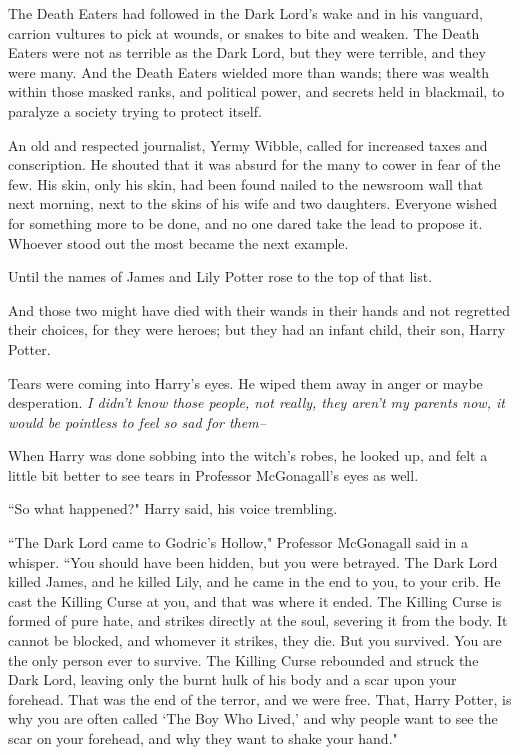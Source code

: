 The Death Eaters had followed in the Dark Lord's wake and in his vanguard, carrion vultures to pick at wounds, or snakes to bite and weaken. The Death Eaters were not as terrible as the Dark Lord, but they were terrible, and they were many. And the Death Eaters wielded more than wands; there was wealth within those masked ranks, and political power, and secrets held in blackmail, to paralyze a society trying to protect itself.

An old and respected journalist, Yermy Wibble, called for increased taxes and conscription. He shouted that it was absurd for the many to cower in fear of the few. His skin, only his skin, had been found nailed to the newsroom wall that next morning, next to the skins of his wife and two daughters. Everyone wished for something more to be done, and no one dared take the lead to propose it. Whoever stood out the most became the next example.

Until the names of James and Lily Potter rose to the top of that list.

And those two might have died with their wands in their hands and not regretted their choices, for they were heroes; but they had an infant child, their son, Harry Potter.

Tears were coming into Harry's eyes. He wiped them away in anger or maybe desperation. \emph{I didn't know those people, not really, they aren't my parents \emph{now}, it would be pointless to feel so sad for them\---}

When Harry was done sobbing into the witch's robes, he looked up, and felt a little bit better to see tears in Professor McGonagall's eyes as well.

``So what happened?" Harry said, his voice trembling.

``The Dark Lord came to Godric's Hollow," Professor McGonagall said in a whisper. ``You should have been hidden, but you were betrayed. The Dark Lord killed James, and he killed Lily, and he came in the end to you, to your crib. He cast the Killing Curse at you, and that was where it ended. The Killing Curse is formed of pure hate, and strikes directly at the soul, severing it from the body. It cannot be blocked, and whomever it strikes, they die. But you survived. You are the only person ever to survive. The Killing Curse rebounded and struck the Dark Lord, leaving only the burnt hulk of his body and a scar upon your forehead. That was the end of the terror, and we were free. That, Harry Potter, is why you are often called `The Boy Who Lived,' and why people want to see the scar on your forehead, and why they want to shake your hand."


